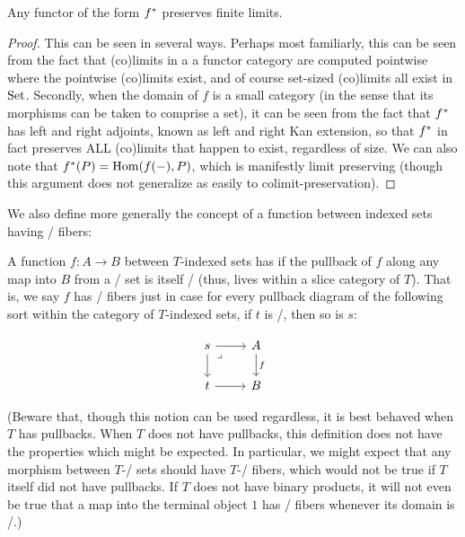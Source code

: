 \begin{theorem}
Any functor of the form $f^*$ preserves finite limits.
\end{theorem}
\begin{proof}
This can be seen in several ways. Perhaps most familiarly, this can be seen from the fact that (co)limits in a a functor category are computed pointwise where the pointwise (co)limits exist, and of course set-sized (co)limits all exist in $\mathrm{Set}$. Secondly, when the domain of $f$ is a small category (in the sense that its morphisms can be taken to comprise a set), it can be seen from the fact that $f^*$ has left and right adjoints, known as left and right Kan extension, so that $f^*$ in fact preserves ALL (co)limits that happen to exist, regardless of size. We can also note that $f^*(P) = \operatorname{Hom}(f(-), P)$, which is manifestly limit preserving (though this argument does not generalize as easily to colimit-preservation).
\end{proof}

We also define more generally the concept of a function between indexed sets having \repsmall/ fibers:
\begin{definition}
A function $f : A \to B$ between $T$-indexed sets has  if the pullback of $f$ along any map into $B$ from a \repsmall/ set is itself \repsmall/ (thus, lives within a slice category of $T$). That is, we say $f$ has \repsmall/ fibers just in case for every pullback diagram of the following sort within the category of $T$-indexed sets, if $t$ is \repsmall/, then so is $s$:

\[\begin{tikzcd}
	s & A \\
	t & B
	\arrow["f", from=1-2, to=2-2]
	\arrow[from=2-1, to=2-2]
	\arrow[from=1-1, to=2-1]
	\arrow[from=1-1, to=1-2]
	\arrow["\lrcorner"{anchor=center, pos=0.125}, draw=none, from=1-1, to=2-2]
\end{tikzcd}\]
\end{definition}

(Beware that, though this notion can be used regardless, it is best behaved when $T$ has pullbacks. When $T$ does not have pullbacks, this definition does not have the properties which might be expected. In particular, we might expect that any morphism between $T$-\repsmall/ sets should have $T$-\repsmall/ fibers, which would not be true if $T$ itself did not have pullbacks. If $T$ does not have binary products, it will not even be true that a map into the terminal object $1$ has \repsmall/ fibers whenever its domain is \repsmall/.)

